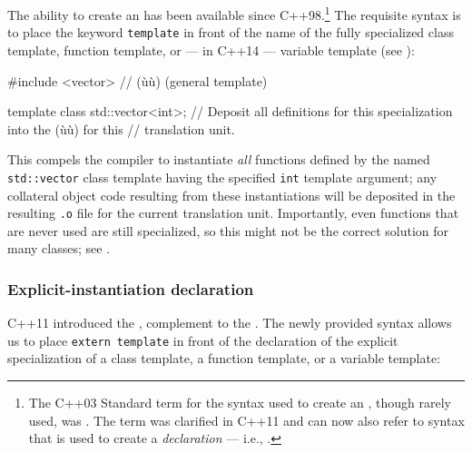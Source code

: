 The ability to create an  has been available since C++98.{\cprotect\footnote{The
  C++03 Standard term for the syntax used to create an
  , though rarely used,
  was . The term
   was clarified in
  C++11 and can now also refer to syntax that is used to create a
  \emph{declaration} --- i.e., .}} The requisite syntax is to place the keyword
\lstinline!template! in front of the name of the fully specialized class
template, function template, or --- in C++14 --- variable
template (see ):

\begin{emcppslisting}
#include <vector>  // (ù{}ù) (general template)

template class std::vector<int>;
    // Deposit all definitions for this specialization into the (ù{}ù) for this
    // translation unit.
\end{emcppslisting}

\noindent This  compels the compiler to
instantiate \emph{all} functions defined by the named
\lstinline!std::vector! class template having the specified \lstinline!int!
template argument; any collateral object code resulting from these
instantiations will be deposited in the resulting \lstinline!.o! file for
the current translation unit. Importantly, even functions that are never
used are still specialized, so this might not be the correct solution
for many classes; see .

\subsubsection[Explicit-instantiation declaration]{Explicit-instantiation declaration}\label{explicit-instantiation-declaration}

C++11 introduced the ,
complement to the . The
newly provided syntax allows us to place
\lstinline!extern!~\lstinline!template! in front of the declaration of the
explicit specialization of a class template, a function template, or a
variable template: %

